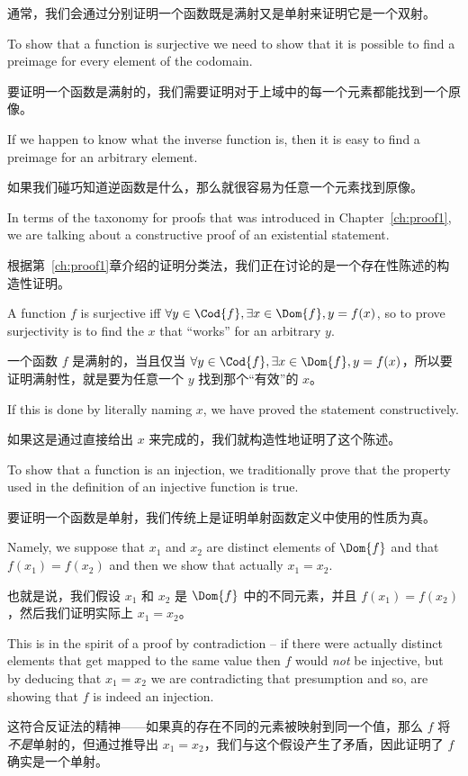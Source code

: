 通常，我们会通过分别证明一个函数既是满射又是单射来证明它是一个双射。

To show that a function is surjective we need to show that it is 
possible to find a preimage for every element of the codomain.

要证明一个函数是满射的，我们需要证明对于上域中的每一个元素都能找到一个原像。

If
we happen to know what the inverse function is, then it is easy to
find a preimage for an arbitrary element.

如果我们碰巧知道逆函数是什么，那么就很容易为任意一个元素找到原像。

In terms of the taxonomy
for proofs that was introduced in Chapter~\ref{ch:proof1}, we are talking
about a constructive proof of an existential statement.

根据第~\ref{ch:proof1}章介绍的证明分类法，我们正在讨论的是一个存在性陈述的构造性证明。

A function $f$
is surjective iff $\forall y \in \Cod{f}, \exists x \in \Dom{f}, 
y = f(x)$, so to prove surjectivity is to find the $x$ that ``works'' for an 
arbitrary $y$.

一个函数 $f$ 是满射的，当且仅当 $\forall y \in \Cod{f}, \exists x \in \Dom{f}, y = f(x)$，所以要证明满射性，就是要为任意一个 $y$ 找到那个“有效”的 $x$。

If this is done by literally naming $x$, we have 
proved the statement constructively.

如果这是通过直接给出 $x$ 来完成的，我们就构造性地证明了这个陈述。

To show that a function
is an injection, we traditionally prove that the property used in the 
definition of an injective function is true.

要证明一个函数是单射，我们传统上是证明单射函数定义中使用的性质为真。

Namely, we suppose that
$x_1$ and $x_2$ are distinct elements of $\Dom{f}$ and that
$f(x_1)=f(x_2)$ and then we show that actually $x_1 = x_2$.

也就是说，我们假设 $x_1$ 和 $x_2$ 是 $\Dom{f}$ 中的不同元素，并且 $f(x_1)=f(x_2)$，然后我们证明实际上 $x_1 = x_2$。

This is
in the spirit of a proof by contradiction -- if there were actually
distinct elements that get mapped to the same value then $f$ would \emph{not}
be injective, but by deducing that $x_1=x_2$ we are contradicting that 
presumption and so, are showing that $f$ is indeed an injection.

这符合反证法的精神——如果真的存在不同的元素被映射到同一个值，那么 $f$ 将\emph{不是}单射的，但通过推导出 $x_1=x_2$，我们与这个假设产生了矛盾，因此证明了 $f$ 确实是一个单射。

